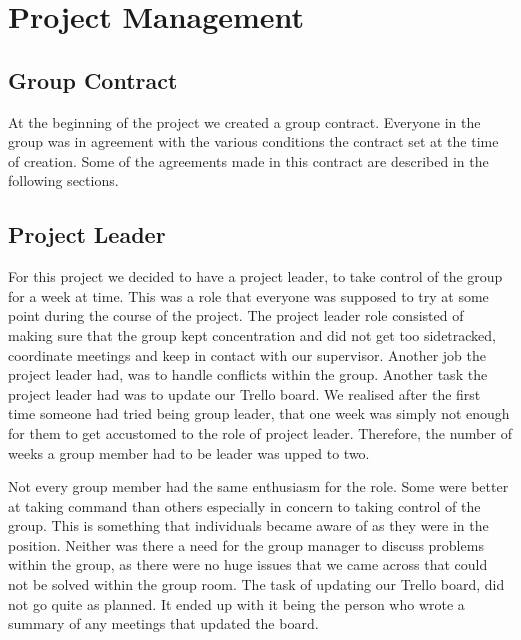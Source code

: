 \documentclass{article}
\begin{document}
\section{Project Management}
\subsection{Group Contract}
At the beginning of the project we created a group contract. 
Everyone in the group was in agreement with the various conditions the contract set at the time of creation. 
Some of the agreements made in this contract are described in the following sections.

\subsection{Project Leader}
For this project we decided to have a project leader, to take control of the group for a week at time. 
This was a role that everyone was supposed to try at some point during the course of the project. 
The project leader role consisted of making sure that the group kept concentration and did not get too sidetracked, coordinate meetings and keep in contact with our supervisor. 
Another job the project leader had, was to handle conflicts within the group. 
Another task the project leader had was to update our Trello board.
We realised after the first time someone had tried being group leader, that one week was simply not enough for them to get accustomed to the role of project leader.
Therefore, the number of weeks a group member had to be leader was upped to two.

Not every group member had the same enthusiasm for the role. 
Some were better at taking command than others especially in concern to taking control of the group.
This is something that individuals became aware of as they were in the position.
Neither was there a need for the group manager to discuss problems within the group, as there were no huge issues that we came across that could not be solved within the group room.
The task of updating our Trello board, did not go quite as planned. 
It ended up with it being the person who wrote a summary of any meetings that updated the board.
\end{document}
